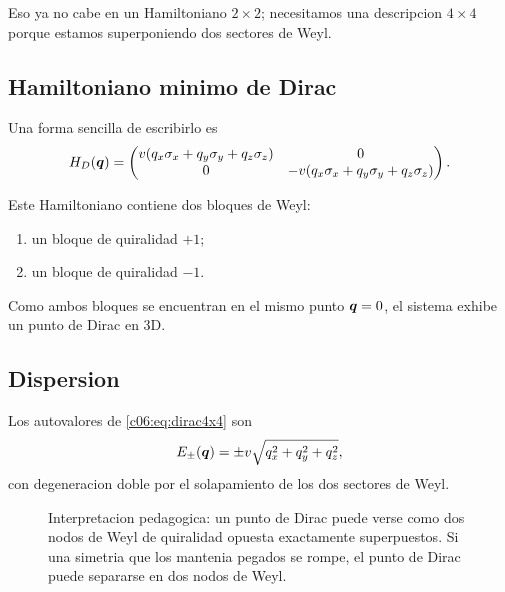 Eso ya no cabe en un Hamiltoniano \(2\times 2\); necesitamos una descripcion \(4\times 4\) porque estamos superponiendo dos sectores de Weyl.

\subsection{Hamiltoniano minimo de Dirac}

Una forma sencilla de escribirlo es
\begin{equation}
H_D(\bm{q})=
\begin{pmatrix}
v(q_x\sigma_x+q_y\sigma_y+q_z\sigma_z) & 0\\
0 & -v(q_x\sigma_x+q_y\sigma_y+q_z\sigma_z)
\end{pmatrix}.
\label{c06:eq:dirac4x4}
\end{equation}

Este Hamiltoniano contiene dos bloques de Weyl:

\begin{enumerate}[leftmargin=*]
  \item un bloque de quiralidad \(+1\);
  \item un bloque de quiralidad \(-1\).
\end{enumerate}

Como ambos bloques se encuentran en el mismo punto \(\bm{q}=0\), el sistema exhibe un punto de Dirac en 3D.

\subsection{Dispersion}

Los autovalores de \eqref{c06:eq:dirac4x4} son
\begin{equation}
E_\pm(\bm{q})=\pm v\sqrt{q_x^2+q_y^2+q_z^2},
\end{equation}
con degeneracion doble por el solapamiento de los dos sectores de Weyl.

\begin{figure}[ht]
\centering
{}
\caption{Interpretacion pedagogica: un punto de Dirac puede verse como dos nodos de Weyl de quiralidad opuesta exactamente superpuestos. Si una simetria que los mantenia pegados se rompe, el punto de Dirac puede separarse en dos nodos de Weyl.}
\label{c06:fig:dirac-splitting}
\end{figure}

